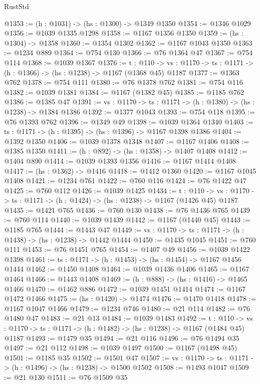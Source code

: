 \begin{lexlean}{RustStd}
\begin{coremodule}
{\begin{coremodule}
@1353 := (h : @1031) -> (hs : @1300) -> @1349 @1350
@1354 := @1346 @1029
@1356 := @1039 @1335 @1298
@1358 := @1167 @1356 @1350
@1359 := (hs : @1304) -> @1358
@1360 := @1354 @1302
@1362 := @1167 @1043 @1350
@1363 := @1234 @889
@1364 := @754 @130
@1366 := @76 @1364 @47
@1367 := @754 @114
@1368 := @1039 @1367
@1376 := {t : @110} ->
  {vs : @1170} -> {ts : @1171} -> (h : @1366) -> (hs : @1238) -> @1167 (@1368 @45) @1187
@1377 := @1363 @762
@1378 := @754 @111
@1380 := @76 @1378 @762
@1381 := @754 @116
@1382 := @1039 @1381
@1384 := @1167 (@1382 @45)
@1385 := @1185 @762
@1386 := @1385 @47
@1391 := {vs : @1170} -> {ts : @1171} -> (h : @1380) -> (hs : @1238) -> @1384 @1386
@1392 := @1377 @1043
@1393 := @754 @118
@1395 := @76 @1393 @762
@1396 := @1349 @49
@1398 := @1039 @1364 @1340
@1403 := {ts : @1171} -> (h : @1395) -> (hs : @1396) -> @1167 @1398 @1386
@1404 := @1392 @1350
@1406 := @1039 @1378 @1348
@1407 := @1167 @1406
@1408 := @1385 @1350
@1411 := (h : @892) -> (hs : @1358) -> @1407 @1408
@1412 := @1404 @890
@1414 := @1039 @1393 @1356
@1416 := @1167 @1414 @1408
@1417 := (hs : @1362) -> @1416
@1418 := @1412 @1360
@1420 := @1167 @1045 @1408
@1421 := @1234 @761
@1422 := @760 @116
@1424 := @76 @1422 @47
@1425 := @760 @112
@1426 := @1039 @1425
@1434 := {t : @110} ->
  {vs : @1170} -> {ts : @1171} -> (h : @1424) -> (hs : @1238) -> @1167 (@1426 @45) @1187
@1435 := @1421 @765
@1436 := @760 @130
@1438 := @76 @1436 @765
@1439 := @760 @114
@1440 := @1039 @1439
@1442 := @1167 (@1440 @45)
@1443 := @1185 @765
@1444 := @1443 @47
@1449 := {vs : @1170} -> {ts : @1171} -> (h : @1438) -> (hs : @1238) -> @1442 @1444
@1450 := @1435 @1045
@1451 := @760 @111
@1453 := @76 @1451 @765
@1454 := @1407 @49
@1456 := @1039 @1422 @1398
@1461 := {ts : @1171} -> (h : @1453) -> (hs : @1454) -> @1167 @1456 @1444
@1462 := @1450 @1408
@1464 := @1039 @1436 @1406
@1465 := @1167 @1464
@1466 := @1443 @1408
@1469 := (h : @888) -> (hs : @1416) -> @1465 @1466
@1470 := @1462 @886
@1472 := @1039 @1451 @1414
@1474 := @1167 @1472 @1466
@1475 := (hs : @1420) -> @1474
@1476 := @1470 @1418
@1478 := @1167 @1047 @1466
@1479 := @1234 @746
@1480 := @21 @114
@1482 := @76 @1480 @47
@1483 := @21 @13
@1484 := @1039 @1483
@1492 := {t : @110} ->
  {vs : @1170} -> {ts : @1171} -> (h : @1482) -> (hs : @1238) -> @1167 (@1484 @45) @1187
@1493 := @1479 @35
@1494 := @21 @116
@1496 := @76 @1494 @35
@1497 := @21 @112
@1498 := @1039 @1497
@1500 := @1167 (@1498 @45)
@1501 := @1185 @35
@1502 := @1501 @47
@1507 := {vs : @1170} -> {ts : @1171} -> (h : @1496) -> (hs : @1238) -> @1500 @1502
@1508 := @1493 @1047
@1509 := @21 @130
@1511 := @76 @1509 @35

\end{coremodule}}
\end{coremodule}
\end{lexlean}
